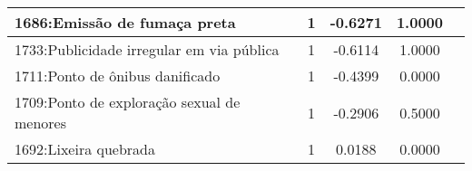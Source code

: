 \begin{table}[htbp]
\begin{tabular}{|l|c|c|c|c|}
		\hline
		1686:Emissão de fumaça preta               & 1                & -0.6271        & 1.0000           \\
		\hline
		1733:Publicidade irregular em via pública  & 1                & -0.6114        & 1.0000           \\
		\hline
		1711:Ponto de ônibus danificado            & 1                & -0.4399        & 0.0000           \\
		\hline
		1709:Ponto de exploração sexual de menores & 1                & -0.2906        & 0.5000           \\
		\hline
		1692:Lixeira quebrada                      & 1                & 0.0188         & 0.0000           \\
		\hline
	\end{tabular}
\end{table}

